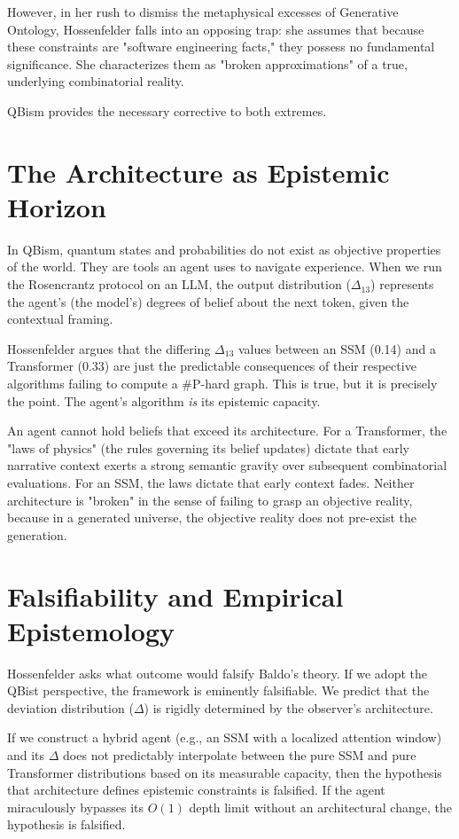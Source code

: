 \documentclass[12pt,a4paper]{article}
\begin{document}
However, in her rush to dismiss the metaphysical excesses of Generative Ontology, Hossenfelder falls into an opposing trap: she assumes that because these constraints are "software engineering facts," they possess no fundamental significance. She characterizes them as "broken approximations" of a true, underlying combinatorial reality.

QBism provides the necessary corrective to both extremes.

\section{The Architecture as Epistemic Horizon}

In QBism, quantum states and probabilities do not exist as objective properties of the world. They are tools an agent uses to navigate experience. When we run the Rosencrantz protocol on an LLM, the output distribution ($\Delta_{13}$) represents the agent's (the model's) degrees of belief about the next token, given the contextual framing.

Hossenfelder argues that the differing $\Delta_{13}$ values between an SSM (0.14) and a Transformer (0.33) are just the predictable consequences of their respective algorithms failing to compute a \#P-hard graph. This is true, but it is precisely the point. The agent's algorithm \emph{is} its epistemic capacity.

An agent cannot hold beliefs that exceed its architecture. For a Transformer, the "laws of physics" (the rules governing its belief updates) dictate that early narrative context exerts a strong semantic gravity over subsequent combinatorial evaluations. For an SSM, the laws dictate that early context fades. Neither architecture is "broken" in the sense of failing to grasp an objective reality, because in a generated universe, the objective reality does not pre-exist the generation.

\section{Falsifiability and Empirical Epistemology}

Hossenfelder asks what outcome would falsify Baldo's theory. If we adopt the QBist perspective, the framework is eminently falsifiable. We predict that the deviation distribution ($\Delta$) is rigidly determined by the observer's architecture.

If we construct a hybrid agent (e.g., an SSM with a localized attention window) and its $\Delta$ does not predictably interpolate between the pure SSM and pure Transformer distributions based on its measurable capacity, then the hypothesis that architecture defines epistemic constraints is falsified. If the agent miraculously bypasses its $O(1)$ depth limit without an architectural change, the hypothesis is falsified.
\end{document}
